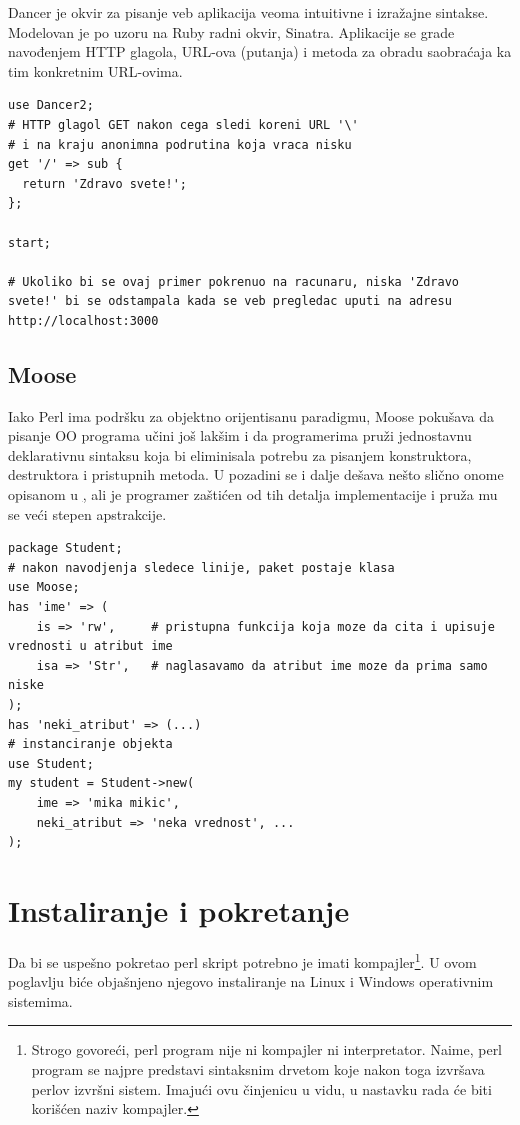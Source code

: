 \documentclass[a4paper]{article}
\begin{document}
Dancer je okvir za pisanje veb aplikacija veoma intuitivne i izražajne sintakse. Modelovan je po uzoru na Ruby radni okvir, Sinatra. Aplikacije se grade navođenjem HTTP glagola, URL-ova (putanja) i metoda za obradu saobraćaja ka tim konkretnim URL-ovima. 

\begin{lstlisting}[label = dancer]
use Dancer2;
# HTTP glagol GET nakon cega sledi koreni URL '\'
# i na kraju anonimna podrutina koja vraca nisku
get '/' => sub { 
  return 'Zdravo svete!';
};
 
start;

# Ukoliko bi se ovaj primer pokrenuo na racunaru, niska 'Zdravo svete!' bi se odstampala kada se veb pregledac uputi na adresu http://localhost:3000 

\end{lstlisting}

\subsection{Moose}

Iako Perl ima podršku za objektno orijentisanu paradigmu, Moose pokušava da pisanje OO programa učini još lakšim i da programerima pruži jednostavnu deklarativnu sintaksu koja bi eliminisala potrebu za pisanjem konstruktora, destruktora i pristupnih metoda. U pozadini se i dalje dešava nešto slično onome opisanom u \href{sec:osobine}, ali je programer zaštićen od tih detalja implementacije i pruža mu se veći stepen apstrakcije.

\begin{lstlisting}[label = moose]
package Student;
# nakon navodjenja sledece linije, paket postaje klasa
use Moose;
has 'ime' => (
    is => 'rw',     # pristupna funkcija koja moze da cita i upisuje vrednosti u atribut ime
    isa => 'Str',   # naglasavamo da atribut ime moze da prima samo niske
);
has 'neki_atribut' => (...)
# instanciranje objekta
use Student;
my student = Student->new(
    ime => 'mika mikic',
    neki_atribut => 'neka vrednost', ...
);
\end{lstlisting}

\section{Instaliranje i pokretanje}
\label{sec:instalacija}

Da bi se uspešno pokretao perl skript potrebno je imati kompajler\footnote{Strogo govoreći, perl program nije ni kompajler ni interpretator. Naime, perl program se najpre predstavi sintaksnim drvetom koje nakon toga izvršava perlov izvršni sistem\cite{glosar}. Imajući ovu činjenicu u vidu, u nastavku rada će biti korišćen naziv kompajler.}. U ovom poglavlju biće objašnjeno njegovo instaliranje na Linux i Windows operativnim sistemima.
\end{document}
